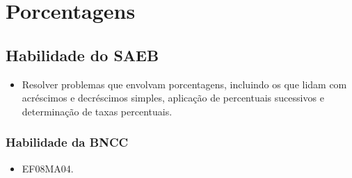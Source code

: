 












\chapter{Porcentagens}

\section*{Habilidade do SAEB} 

\begin{itemize}
\item Resolver problemas que envolvam porcentagens,
incluindo os que lidam com acréscimos e decréscimos simples, aplicação
de percentuais sucessivos e determinação de taxas percentuais.
\end{itemize}

\subsection{Habilidade da BNCC}

\begin{itemize}
\item EF08MA04.
\end{itemize}



